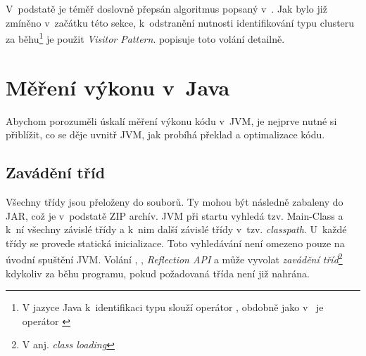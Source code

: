 V~podstatě je téměř doslovně přepsán algoritmus popsaný v~. Jak bylo již zmíněno v~začátku této sekce, k~odstranění nutnosti identifikování typu clusteru za běhu\footnote{V jazyce Java k~identifikaci typu slouží operátor \cite{gosling2013java}, obdobně jako v~\CC{} je operátor \cite{ISO:2012:CPP}} je použit \emph{Visitor Pattern}.  popisuje toto volání detailně.


%
%

\section{Měření výkonu v~Java\label{sec:vykonvjava}}

Abychom porozuměli úskalí měření výkonu kódu v~JVM, je nejprve nutné si přiblížit, co se děje uvnitř JVM, jak probíhá překlad a optimalizace kódu.

\subsection{Zavádění tříd}

Všechny třídy jsou přeloženy do \classfile{} souborů. Ty mohou být následně zabaleny do JAR, což je v~podstatě ZIP archív. JVM při startu vyhledá tzv. Main-Class a k~ní všechny závislé třídy a k~nim další závislé třídy v~tzv. \emph{classpath}. U~každé třídy se provede statická inicializace. Toto vyhledávání není omezeno pouze na úvodní spuštění JVM. Volání , , \emph{Reflection API} a  může vyvolat \emph{zavádění tříd}\footnote{V anj. \emph{class loading}} kdykoliv za běhu programu, pokud požadovaná třída není již nahrána\cite{gosling2013java}\cite{lindholm2013java}.

